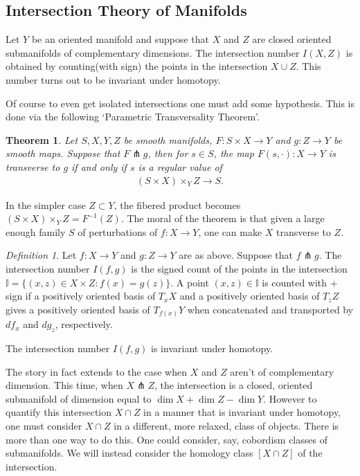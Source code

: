 \documentclass[12pt]{amsart}
\newtheorem{theorem}{Theorem}
\theoremstyle{remark}
\newtheorem{definition}{Definition}
\begin{document}
 \subsection{Intersection Theory of Manifolds}
 Let $Y$ be an oriented manifold and suppose that $X$ and $Z$ are closed oriented submanifolds of complementary dimensions. The intersection number $I ( X , Z)$ is obtained by counting(with sign) the points in the intersection $ X \cup Z$. This number turns out to be invariant under homotopy. 
 
 Of course to even get isolated intersections one must add some hypothesis. This is done via the following `Parametric Transversality Theorem'. 
 \begin{theorem}
Let $S,X,Y,Z$ be smooth manifolds, $F: S \times X \rightarrow Y$ and $ g: Z \rightarrow Y$ be  smooth maps. Suppose that $ F \pitchfork g$, then for $ s \in S$, the map $F(s, \cdot): X \rightarrow Y$ is transverse to $g$ if and only if $s$ is a regular value of
\begin{align*}
    (S \times X) \times_{Y} Z \rightarrow S.
\end{align*}
 \end{theorem}
 In the simpler case $ Z \subset Y$, the fibered product becomes $     (S \times X) \times_{Y} Z = F^{-1} (Z).$ The moral of the theorem is that given a large enough family $S$ of perturbations of $f: X \rightarrow Y$, one can make $X$ transverse to $Z$. 

 \begin{definition}
Let $ f: X \rightarrow Y $ and $g: Z \rightarrow Y$ are as above. Suppose that $ f \pitchfork g$. The intersection number $ I (f,g) $ is the signed count of the points in the intersection $ \mathbb{I } = \lbrace (x, z) \in X \times Z: f (x) = g (z) \rbrace$. A point $(x,z) \in \mathbb{I}$ is counted with $ + $ sign if a positively oriented basis of $T_x X$ and a positively oriented basis  of $T_z Z$ gives a positively oriented basis of $T_{f(x)} Y$ when concatenated and transported by $ d f_x$ and $ dg_z$, respectively.
 \end{definition}

 The intersection number $I (f, g)$ is invariant under homotopy. 
 
 The story in fact extends to the case when $X$ and $Z$ aren't of complementary dimension. This time, when $ X \pitchfork Z$, the intersection is a closed, oriented submanifold of dimension equal to $ \dim X + \dim Z - \dim Y$.  However to quantify this intersection $X \cap Z$ in a manner that is invariant under homotopy, one must consider $X \cap Z$ in a different, more relaxed, class of objects. There is more than one way to do this. One could consider, say, cobordism classes of submanifolds. We will instead consider the homology class $[X \cap Z ]$ of the intersection.
\end{document}
